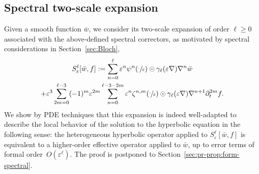 \documentclass[JEP,XML,SOM,Unicode,published]{cedram}
\theoremstyle{plain}
\theoremstyle{definition}
\numberwithin{equation}{section}
\newcommand{\e}{\varepsilon}
\begin{document}
\subsection{Spectral two-scale expansion}
Given a smooth function $\bar w$, we consider its two-scale expansion of order $\ell\ge 0$ associated with the above-defined spectral correctors, as motivated by spectral considerations in Section~\ref{sec:Bloch},
\begin{multline}\label{eq:2s-spec}
S_\e^\ell[\bar w,f]:=\sum_{n=0}^\ell \e^n \psi^n(\sfrac\cdot\e)\odot \gamma_{\ell}(\e\nabla)\nabla^n\bar w\\
+\e^3 \sum_{2m=0}^{\ell-3}(-1)^m\e^{2m} \sum_{n=0}^{\ell-3-2m} \e^n \zeta^{n,m}(\sfrac\cdot\e)\odot \gamma_{\ell} (\e \nabla) \nabla^{n+1}\partial_t^{2m} f.
\end{multline}
We show by PDE techniques that this expansion is indeed well-adapted to describe the local behavior of the solution to the hyperbolic equation in the following sense: the heterogeneous hyperbolic operator applied to $S^\ell_\e[\bar w,f]$ is equivalent to a higher-order effective operator applied to $\bar w$, up to error terms of formal order~$O(\e^\ell)$. The proof is postponed to Section~\ref{sec:pr-prop:form-spectral}.
\end{document}
